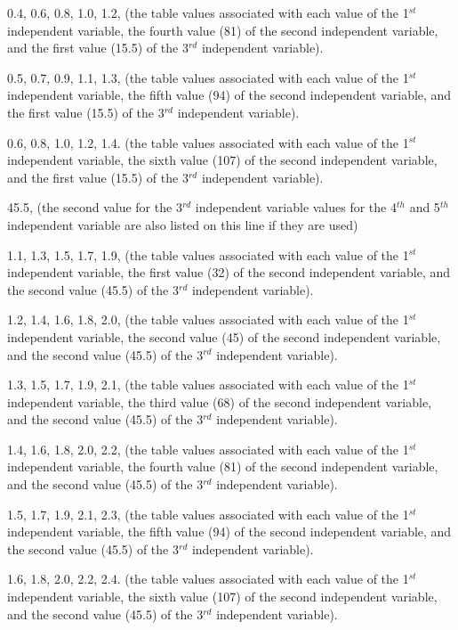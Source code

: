 0.4, 0.6, 0.8, 1.0, 1.2, (the table values associated with each value of the 1\(^{st}\) independent variable, the fourth value (81) of the second independent variable, and the first value (15.5) of the 3\(^{rd}\) independent variable).

0.5, 0.7, 0.9, 1.1, 1.3, (the table values associated with each value of the 1\(^{st}\) independent variable, the fifth value (94) of the second independent variable, and the first value (15.5) of the 3\(^{rd}\) independent variable).

0.6, 0.8, 1.0, 1.2, 1.4. (the table values associated with each value of the 1\(^{st}\) independent variable, the sixth value (107) of the second independent variable, and the first value (15.5) of the 3\(^{rd}\) independent variable).

45.5, (the second value for the 3\(^{rd}\) independent variable values for the 4\(^{th}\) and 5\(^{th}\) independent variable are also listed on this line if they are used)

1.1, 1.3, 1.5, 1.7, 1.9, (the table values associated with each value of the 1\(^{st}\) independent variable, the first value (32) of the second independent variable, and the second value (45.5) of the 3\(^{rd}\) independent variable).

1.2, 1.4, 1.6, 1.8, 2.0, (the table values associated with each value of the 1\(^{st}\) independent variable, the second value (45) of the second independent variable, and the second value (45.5) of the 3\(^{rd}\) independent variable).

1.3, 1.5, 1.7, 1.9, 2.1, (the table values associated with each value of the 1\(^{st}\) independent variable, the third value (68) of the second independent variable, and the second value (45.5) of the 3\(^{rd}\) independent variable).

1.4, 1.6, 1.8, 2.0, 2.2, (the table values associated with each value of the 1\(^{st}\) independent variable, the fourth value (81) of the second independent variable, and the second value (45.5) of the 3\(^{rd}\) independent variable).

1.5, 1.7, 1.9, 2.1, 2.3, (the table values associated with each value of the 1\(^{st}\) independent variable, the fifth value (94) of the second independent variable, and the second value (45.5) of the 3\(^{rd}\) independent variable).

1.6, 1.8, 2.0, 2.2, 2.4. (the table values associated with each value of the 1\(^{st}\) independent variable, the sixth value (107) of the second independent variable, and the second value (45.5) of the 3\(^{rd}\) independent variable).

